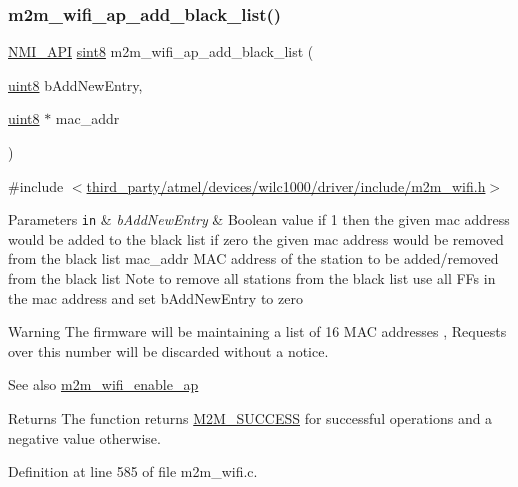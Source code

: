 \subsubsection{\texorpdfstring{m2m\+\_\+wifi\+\_\+ap\+\_\+add\+\_\+black\+\_\+list()}{m2m\_wifi\_ap\_add\_black\_list()}}
{\footnotesize\ttfamily \hyperlink{group__BSPDefine_gaecc0323d771e41ef81a76b5f12783e22}{N\+M\+I\+\_\+\+A\+PI} \hyperlink{group__DataT_gae35f10ffd0ac8dd2bc3e794da9bdfbc7}{sint8} m2m\+\_\+wifi\+\_\+ap\+\_\+add\+\_\+black\+\_\+list (\begin{DoxyParamCaption}\item[{\hyperlink{group__DataT_ga4df709a77647e870bbf1d955b8edc9a6}{uint8}}]{b\+Add\+New\+Entry,  }\item[{\hyperlink{group__DataT_ga4df709a77647e870bbf1d955b8edc9a6}{uint8} $\ast$}]{mac\+\_\+addr }\end{DoxyParamCaption})}



{\ttfamily \#include $<$\hyperlink{m2m__wifi_8h}{third\+\_\+party/atmel/devices/wilc1000/driver/include/m2m\+\_\+wifi.\+h}$>$}


\begin{DoxyParams}[1]{Parameters}
\mbox{\tt in}  & {\em b\+Add\+New\+Entry} & Boolean value if 1 then the given mac address would be added to the black list if zero the given mac address would be removed from the black list mac\+\_\+addr M\+AC address of the station to be added/removed from the black list Note to remove all stations from the black list use all FF\textquotesingle{}s in the mac address and set b\+Add\+New\+Entry to zero \\
\hline
\end{DoxyParams}
\begin{DoxyWarning}{Warning}
The firmware will be maintaining a list of 16 M\+AC addresses , Requests over this number will be discarded without a notice.
\end{DoxyWarning}
\begin{DoxySeeAlso}{See also}
\hyperlink{group__WifiEnableApFn_gab34cff419964df3c4e1ed86076aef7ce}{m2m\+\_\+wifi\+\_\+enable\+\_\+ap} 
\end{DoxySeeAlso}
\begin{DoxyReturn}{Returns}
The function returns \hyperlink{nm__common_8h_a9ef27ba27aafdd1aa3a79d3ba2c36b8f}{M2\+M\+\_\+\+S\+U\+C\+C\+E\+SS} for successful operations and a negative value otherwise. 
\end{DoxyReturn}


Definition at line 585 of file m2m\+\_\+wifi.\+c.


